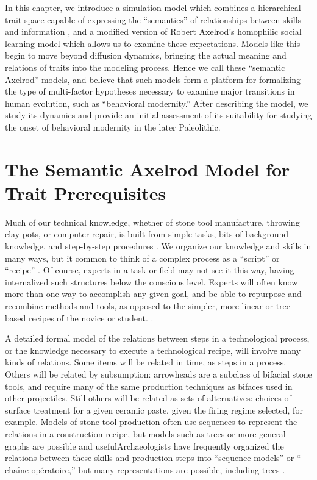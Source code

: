 \documentclass[graybox,natbib]{svmult}
\begin{document}
In this chapter, we introduce a simulation model which combines a
hierarchical trait space capable of expressing the ``semantics'' of
relationships between skills and information \citep{Mesoudi2008a}, and a
modified version of Robert Axelrod's \citep{axelrod1997} homophilic
social learning model which allows us to examine these expectations.
Models like this begin to move beyond diffusion dynamics, bringing the
actual meaning and relations of traits into the modeling process. Hence
we call these ``semantic Axelrod'' models, and believe that such models
form a platform for formalizing the type of multi-factor hypotheses
necessary to examine major transitions in human evolution, such as
``behavioral modernity.'' After describing the model, we study its
dynamics and provide an initial assessment of its suitability for
studying the onset of behavioral modernity in the later Paleolithic.

\section{The Semantic Axelrod Model for Trait
Prerequisites}\label{the-semantic-axelrod-model-for-trait-prerequisites}

Much of our technical knowledge, whether of stone tool manufacture,
throwing clay pots, or computer repair, is built from simple tasks, bits
of background knowledge, and step-by-step procedures
\citep{neff1992ceramics, schiffer1987theory}. We organize our knowledge
and skills in many ways, but it common to think of a complex process as
a ``script'' or ``recipe'' \citep{schank1977scripts}. Of course, experts
in a task or field may not see it this way, having internalized such
structures below the conscious level. Experts will often know more than
one way to accomplish any given goal, and be able to repurpose and
recombine methods and tools, as opposed to the simpler, more linear or
tree-based recipes of the novice or student.
\citep[e.g.,][]{Bleed:2008in, bleed2002obviously, stout2002skill}.

A detailed formal model of the relations between steps in a
technological process, or the knowledge necessary to execute a
technological recipe, will involve many kinds of relations. Some items
will be related in time, as steps in a process. Others will be related
by subsumption: arrowheads are a subclass of bifacial stone tools, and
require many of the same production techniques as bifaces used in other
projectiles. Still others will be related as sets of alternatives:
choices of surface treatment for a given ceramic paste, given the firing
regime selected, for example. Models of stone tool production often use
sequences to represent the relations in a construction recipe, but
models such as trees or more general graphs are possible and
usefulArchaeologists have frequently organized the relations between
these skills and production steps into ``sequence models'' or
``$\textrm{cha\^ine op\'eratoire}$,'' but many representations are
possible, including trees
\citep{Bamforth:2008kq, Bleed:2008in, Ferguson:2008ce, Hogberg:2008fj, bleed2001trees, bleed2002obviously, schiffer1987theory, stout2002skill}.
\end{document}
